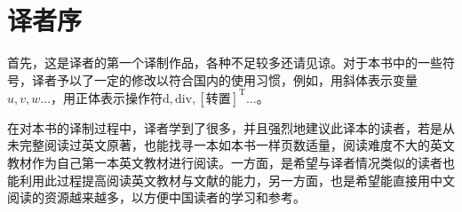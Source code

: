 \chapter*{译者序}

首先，这是译者的第一个译制作品，各种不足较多还请见谅。对于本书中的一些符号，译者予以了一定的修改以符合国内的使用习惯，例如，用斜体表示变量$u,v,w\dots$，用正体表示操作符$\mathrm{d},\mathrm{div},[\text{转置}]^{\mathrm{T}}\dots$。


在对本书的译制过程中，译者学到了很多，并且强烈地建议此译本的读者，若是从未完整阅读过英文原著，也能找寻一本如本书一样页数适量，阅读难度不大的英文教材作为自己第一本英文教材进行阅读。一方面，是希望与译者情况类似的读者也能利用此过程提高阅读英文教材与文献的能力，另一方面，也是希望能直接用中文阅读的资源越来越多，以方便中国读者的学习和参考。

